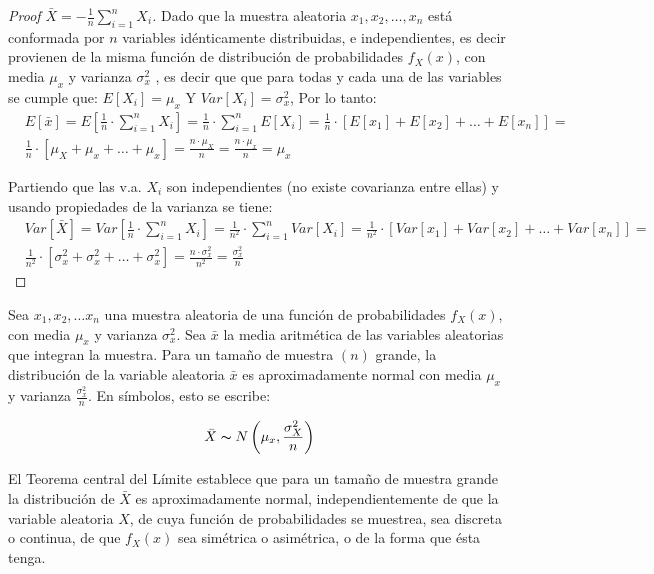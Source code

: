 \begin{proof}[Proof $\bar{X}=-\frac{1}{n}\sum_{i=1}^nX_i$]
    Dado que la muestra aleatoria $x_1 ,x_2 ,\dots,x_n$ está conformada por $n$
    variables idénticamente distribuidas, e independientes, es decir provienen
    de la misma función de distribución de probabilidades $f_X (x)$, con media $\mu_x$
    y varianza $\sigma^2_x$ , es decir que que para todas y cada una de las
    variables se cumple que: $E[X_i ]=\mu_x$ Y $Var[X_i ]=\sigma^2_x$, Por lo tanto:
\begin{align*}
        &E[ \bar{x}]=E[\frac{1}{n}\cdot\sum_{i=1}^n X_i]=\frac{1}{n}\cdot  \sum_{i=1}^nE[X_i]=\frac{1}{n}\cdot  [E[x_1]+E[x_2]+\dots +E[x_n]]=\\
        &\frac{1}{n}\cdot [\mu_X +\mu_x+\dots +\mu_x]=\frac{n\cdot  \mu_X}{n}=\frac{n\cdot\mu_x}{n}=\mu_x
    \end{align*}

    Partiendo que las v.a. $X_i$ son independientes (no existe covarianza entre ellas)
    y usando propiedades de la varianza se tiene:
\begin{align*}
        &Var[\bar{X} ]=Var[\frac{1}{n}\cdot\sum_{i=1}^n X_i]=\frac{1}{n^2}\cdot  \sum_{i=1}^nVar[X_i]=\frac{1}{n^2}\cdot  [Var[x_1]+Var[ x_2]+\dots +Var[ x_n]]=\\
        &\frac{1}{n^2}\cdot  [\sigma_x^2+\sigma_x^2+\dots +\sigma_x^2]=\frac{n\cdot \sigma_x^2}{n^2}=\frac{\sigma_x^2}{n}
    \end{align*}
\end{proof}

\begin{theorem}

\end{theorem}

Sea $x_1,x_2,\dots x_n$ una muestra aleatoria de una función de probabilidades $f_X(x)$, con media $\mu_x$  y varianza  $\sigma^2_x$. Sea $\bar{x}$ la media aritmética de las variables aleatorias que integran la muestra. Para un tamaño de muestra $(n)$ grande, la distribución de la variable aleatoria $\bar{x}$ es aproximadamente normal con media $\mu_x$  y varianza $\frac{\sigma^2_x}{n}$.  En símbolos, esto se escribe:

\begin{equation}
    \bar{X} \thicksim  N\left(\mu_x,\frac{\sigma_X^2}{n}\right)
\end{equation}


El Teorema central del Límite establece que para un
tamaño de muestra grande la distribución de $\bar{X}$ es
aproximadamente normal, independientemente de
que la variable aleatoria $X$, de cuya función de
probabilidades se muestrea, sea discreta o continua,
de que $f_X(x)$ sea simétrica o asimétrica, o de la forma
que ésta tenga.


